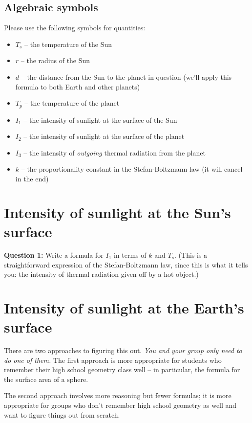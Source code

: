 \documentclass[11pt]{article}
\def\BI{\begin{itemize}}
\def\EI{\end{itemize}}
\begin{document}
\subsection*{Algebraic symbols}

Please use the following symbols for quantities:

\BI
\item $T_s$ -- the temperature of the Sun
\item $r$ -- the radius of the Sun
\item $d$ -- the distance from the Sun to the planet in question (we'll apply this formula to both Earth and other planets)
\item $T_p$ -- the temperature of the planet
\item $I_1$ -- the intensity of sunlight at the surface of the Sun
\item $I_2$ -- the intensity of sunlight at the surface of the planet
\item $I_3$ -- the intensity of {\it outgoing} thermal radiation from the planet
\item $k$ -- the proportionality constant in the Stefan-Boltzmann law (it will cancel in the end)
\EI

\section*{Intensity of sunlight at the Sun's surface}

{\bf Question 1:} Write a formula for $I_1$ in terms of $k$ and $T_s$. (This is a straightforward expression of the Stefan-Boltzmann law, since this is what it tells you: the intensity of thermal radiation
given off by a hot object.)

\vspace*{2cm}

\hrulefill

\section*{Intensity of sunlight at the Earth's surface}

There are two approaches to figuring this out. {\it You and your group only need to do one of them.} The first approach is more appropriate for students who remember their high school geometry class well -- in particular, the formula for the surface area of a sphere.

The second approach involves more reasoning but fewer formulas; it is more appropriate for groups who don't remember high school geometry as well and want to figure things out from scratch.
\newpage
\end{document}
